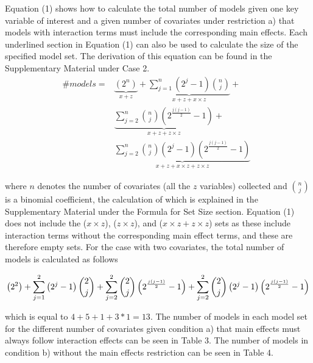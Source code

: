 Equation (1) shows how to calculate the total number of models given one key variable of interest and a given number of covariates under restriction a) that models with interaction terms must include the corresponding main effects. Each underlined section in Equation (1) can also be used to calculate the size of the specified model set. The derivation of this equation can be found in the Supplementary Material under Case 2. \\

\begin{equation} 
\begin{aligned}
\#models={} & \underbrace{\left(2^n\right)}_{x + z}+\underbrace{\sum^n_{j=1}{\left(2^j-1\right)\binom{n}{j}}}_{x + z + x \times z} + \\ 
& \underbrace{\sum^n_{j=2}{\binom{n}{j}\left(2^{\frac{j\left(j-1\right)}{2}}-1\right)}}_{x + z + z \times z} + \\
& \underbrace{\sum^n_{j=2}{\binom{n}{j}\left(2^j-1\right)\left(2^{\frac{j\left(j-1\right)}{2}}-1\right)}}_{x + z + x \times z + z \times z}\ \  
\end{aligned}
\end{equation} 

where $n$ denotes the number of covariates (all the $z$ variables) collected and $\binom{n}{j}$ is a binomial coefficient, the calculation of which is explained in the Supplementary Material under the Formula for Set Size section.
Equation (1) does not include the ($x \times z$), ($z \times z$), and ($x \times z + z \times z$) sets as these include interaction terms without the corresponding main effect terms, and these are therefore empty sets. For the case with two covariates, the total number of models is calculated as follows

\begin{equation*}
\centering
\left(2^2\right)+
\sum^2_{j=1}{\left(2^j-1\right) \binom{2}{j}}+
\sum^2_{j=2}{\binom{2}{j}\left(2^{\frac{j\left(j-1\right)}{2}}-1\right)}+  
\sum^2_{j=2}{\binom{2}{j}\left(2^j-1\right)\left(2^{\frac{j\left(j-1\right)}{2}}-1\right)}
\end{equation*}

which is equal to $4+5+1+3*1=13$. The number of models in each model set for the different number of covariates given condition a) that main effects must always follow interaction effects can be seen in Table 3. The number of models in condition b) without the main effects restriction can be seen in Table 4. \\

